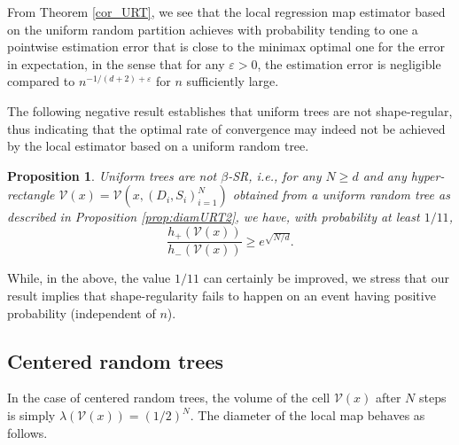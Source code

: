 \documentclass[paper=a4, fontsize=11pt]{scrartcl}
\newtheorem{proposition}[theorem]{Proposition}
\begin{document}
%

%

%

From Theorem \ref{cor_URT},  we see that the local regression map estimator based on the uniform random partition achieves with probability tending to one a pointwise estimation error that is close to the minimax optimal one for the error in expectation, in the sense that for any $\varepsilon>0$, the estimation error is negligible compared to $n^{-1/(d+2)+\varepsilon}$ for $n$ sufficiently large.



The following negative result establishes that uniform trees are not shape-regular, thus indicating that the optimal rate of convergence may indeed not be achieved by the local estimator based on a uniform random tree. 


\begin{proposition}\label{uniform tree not regular}
Uniform trees are not $\beta$-SR, i.e., for any \( N \geq d \) and any hyper-rectangle $\mathcal V (x)= \mathcal V(x, (D_i,S_i)_{i=1}^N)$ obtained from a uniform random tree as described in Proposition \ref{prop:diamURT2}, we have, with probability at least $1/11$,
$$\dfrac{h_+(\mathcal V (x) )}{h_-(\mathcal V (x) )} \geq e^{\sqrt{N/d}}.$$
\end{proposition}

While, in the above, the value $1/11$ can certainly be improved, we stress that our result implies that shape-regularity fails to happen on an event having positive probability (independent of $n$).


\subsection{Centered random trees}\label{subsec_centered}

In the case of centered random trees, the volume of the cell $\mathcal{V}(x)$ after $N$ steps is simply $  \lambda(\mathcal{V}(x))= (1/2)^N$. The diameter of the local map behaves as follows.
\end{document}
